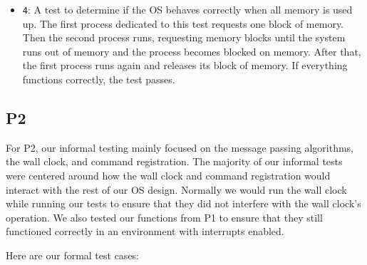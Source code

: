 \documentclass[12pt]{report}
\begin{document}
\begin{itemize}
	\item \texttt{4}: A test to determine if the OS behaves correctly when all memory is used up.  The first process dedicated to this test requests one block of memory.  Then the second process runs, requesting memory blocks until the system runs out of memory and the process becomes blocked on memory.  After that, the first process runs again and releases its block of memory.  If everything functions correctly, the test passes.
\end{itemize}

\subsection{P2}

For P2, our informal testing mainly focused on the message passing algorithms, the wall clock, and command registration.  The majority of our informal tests were centered around how the wall clock and command registration would interact with the rest of our OS design.  Normally we would run the wall clock while running our tests to ensure that they did not interfere with the wall clock's operation.  We also tested our functions from P1 to ensure that they still functioned correctly in an environment with interrupts enabled.

Here are our formal test cases:
\end{document}
